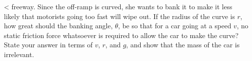 <%
freeway. Since the off-ramp is curved, she wants to bank it
to make it less likely that motorists going too fast will
wipe out. If the radius of the curve is $r$, how great
should the banking angle, $\theta $, be so that for a car
going at a speed $v$, no static friction force whatsoever is
required to allow the car to make the curve? State your
answer in terms of $v$, $r$, and $g$, and show that the mass of
the car is irrelevant.
